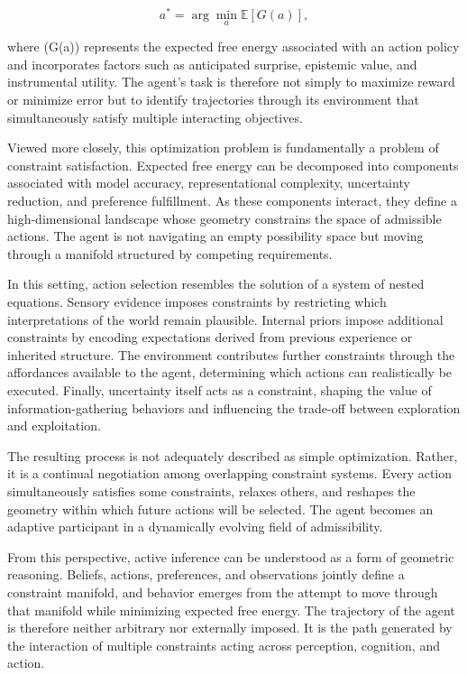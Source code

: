 \documentclass[12pt,letterpaper]{article}
\theoremstyle{remark}
\begin{document}
\[
a^\ast = \arg\min_a \mathbb{E}[G(a)],
\]

where (G(a)) represents the expected free energy associated with an action policy and incorporates factors such as anticipated surprise, epistemic value, and instrumental utility. The agent's task is therefore not simply to maximize reward or minimize error but to identify trajectories through its environment that simultaneously satisfy multiple interacting objectives.

Viewed more closely, this optimization problem is fundamentally a problem of constraint satisfaction. Expected free energy can be decomposed into components associated with model accuracy, representational complexity, uncertainty reduction, and preference fulfillment. As these components interact, they define a high-dimensional landscape whose geometry constrains the space of admissible actions. The agent is not navigating an empty possibility space but moving through a manifold structured by competing requirements.

In this setting, action selection resembles the solution of a system of nested equations. Sensory evidence imposes constraints by restricting which interpretations of the world remain plausible. Internal priors impose additional constraints by encoding expectations derived from previous experience or inherited structure. The environment contributes further constraints through the affordances available to the agent, determining which actions can realistically be executed. Finally, uncertainty itself acts as a constraint, shaping the value of information-gathering behaviors and influencing the trade-off between exploration and exploitation.

The resulting process is not adequately described as simple optimization. Rather, it is a continual negotiation among overlapping constraint systems. Every action simultaneously satisfies some constraints, relaxes others, and reshapes the geometry within which future actions will be selected. The agent becomes an adaptive participant in a dynamically evolving field of admissibility.

From this perspective, active inference can be understood as a form of geometric reasoning. Beliefs, actions, preferences, and observations jointly define a constraint manifold, and behavior emerges from the attempt to move through that manifold while minimizing expected free energy. The trajectory of the agent is therefore neither arbitrary nor externally imposed. It is the path generated by the interaction of multiple constraints acting across perception, cognition, and action.
\end{document}
